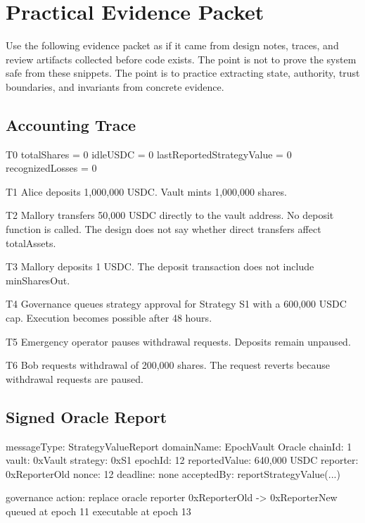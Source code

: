 \section*{Practical Evidence Packet}

Use the following evidence packet as if it came from design notes, traces, and review artifacts collected before code exists. The point is not to prove the system safe from these snippets. The point is to practice extracting state, authority, trust boundaries, and invariants from concrete evidence.

\subsection*{Accounting Trace}

\begin{codeblock}
T0
    totalShares = 0
    idleUSDC = 0
    lastReportedStrategyValue = 0
    recognizedLosses = 0

T1
    Alice deposits 1,000,000 USDC.
    Vault mints 1,000,000 shares.

T2
    Mallory transfers 50,000 USDC directly to the vault address.
    No deposit function is called.
    The design does not say whether direct transfers affect totalAssets.

T3
    Mallory deposits 1 USDC.
    The deposit transaction does not include minSharesOut.

T4
    Governance queues strategy approval for Strategy S1 with a 600,000 USDC cap.
    Execution becomes possible after 48 hours.

T5
    Emergency operator pauses withdrawal requests.
    Deposits remain unpaused.

T6
    Bob requests withdrawal of 200,000 shares.
    The request reverts because withdrawal requests are paused.
\end{codeblock}

\subsection*{Signed Oracle Report}

\begin{codeblock}
messageType: StrategyValueReport
domainName: EpochVault Oracle
chainId: 1
vault: 0xVault
strategy: 0xS1
epochId: 12
reportedValue: 640,000 USDC
reporter: 0xReporterOld
nonce: 12
deadline: none
acceptedBy: reportStrategyValue(...)

governance action:
    replace oracle reporter 0xReporterOld -> 0xReporterNew
    queued at epoch 11
    executable at epoch 13
\end{codeblock}

